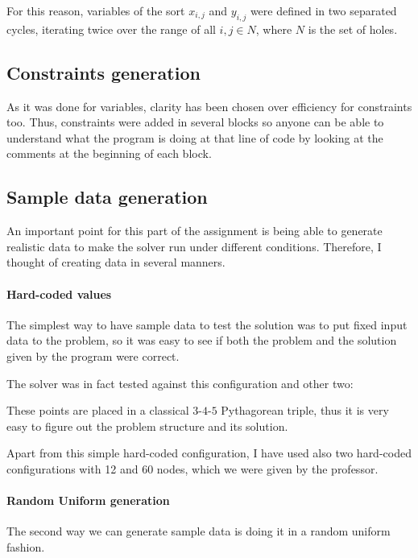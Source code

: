 For this reason, variables of the sort $x_{i,j}$ and $y_{i,j}$ were defined in
two separated cycles, iterating twice over the range of all $i,j\in{N}$, where
$N$ is the set of holes.

\subsection{Constraints generation}
As it was done for variables, clarity has been chosen over efficiency for
constraints too. Thus, constraints were added in several blocks so anyone can
be able to understand what the program is doing at that line of code by looking
at the comments at the beginning of each block.

\subsection{Sample data generation}
An important point for this part of the assignment is being able to generate
realistic data to make the solver run under different conditions.
Therefore, I thought of creating data in several manners.

\paragraph{Hard-coded values} The simplest way to have sample data to test the
solution was to put fixed input data to the problem, so it was easy to see if
both the problem and the solution given by the program were correct.

The solver was in fact tested against this configuration and other two:

\begin{figure}[h!]
\centering
{}
\end{figure}

These points are placed in a classical $3$-$4$-$5$ Pythagorean triple, thus it
is very easy to figure out the problem structure and its solution.

Apart from this simple hard-coded configuration, I have used also two hard-coded
configurations with 12 and 60 nodes, which we were given by the professor.

\paragraph{Random Uniform generation} The second way we can generate sample data
is doing it in a random uniform fashion.


